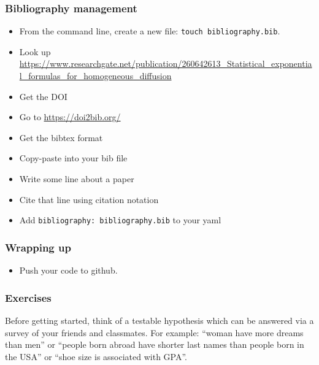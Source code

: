 \documentclass[
]{book}
\providecommand{\tightlist}{%
  \setlength{\itemsep}{0pt}\setlength{\parskip}{0pt}}
\begin{document}
\hypertarget{bibliography-management}{%
\subsubsection*{Bibliography management}\label{bibliography-management}}

\begin{itemize}
\tightlist
\item
  From the command line, create a new file: \texttt{touch\ bibliography.bib}.\\
\item
  Look up \url{https://www.researchgate.net/publication/260642613_Statistical_exponential_formulas_for_homogeneous_diffusion}\\
\item
  Get the DOI\\
\item
  Go to \url{https://doi2bib.org/}\\
\item
  Get the bibtex format\\
\item
  Copy-paste into your bib file\\
\item
  Write some line about a paper\\
\item
  Cite that line using citation notation\\
\item
  Add \texttt{bibliography:\ bibliography.bib} to your yaml
\end{itemize}

\hypertarget{wrapping-up}{%
\subsubsection*{Wrapping up}\label{wrapping-up}}

\begin{itemize}
\tightlist
\item
  Push your code to github.
\end{itemize}

\hypertarget{exercises}{%
\subsubsection{Exercises}\label{exercises}}

Before getting started, think of a testable hypothesis which can be answered via a survey of your friends and classmates. For example: ``woman have more dreams than men'' or ``people born abroad have shorter last names than people born in the USA'' or ``shoe size is associated with GPA''.
\end{document}

